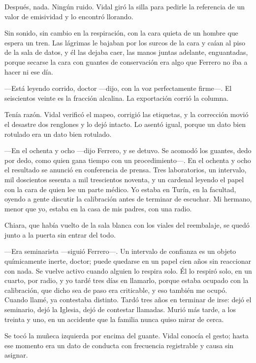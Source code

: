 Después, nada. Ningún ruido. Vidal giró la silla para pedirle la referencia de un valor de emisividad y lo encontró llorando.

Sin sonido, sin cambio en la respiración, con la cara quieta de un hombre que espera un tren. Las lágrimas le bajaban por los surcos de la cara y caían al piso de la sala de datos, y él las dejaba caer, las manos juntas adelante, enguantadas, porque secarse la cara con guantes de conservación era algo que Ferrero no iba a hacer ni ese día.

---Está leyendo corrido, doctor ---dijo, con la voz perfectamente firme---. El seiscientos veinte es la fracción alcalina. La exportación corrió la columna.

Tenía razón. Vidal verificó el mapeo, corrigió las etiquetas, y la corrección movió el desastre dos renglones y lo dejó intacto. Lo asentó igual, porque un dato bien rotulado era un dato bien rotulado.

---En el ochenta y ocho ---dijo Ferrero, y se detuvo. Se acomodó los guantes, dedo por dedo, como quien gana tiempo con un procedimiento---. En el ochenta y ocho el resultado se anunció en conferencia de prensa. Tres laboratorios, un intervalo, mil doscientos sesenta a mil trescientos noventa, y un cardenal leyendo el papel con la cara de quien lee un parte médico. Yo estaba en Turín, en la facultad, oyendo a gente discutir la calibración antes de terminar de escuchar. Mi hermano, menor que yo, estaba en la casa de mis padres, con una radio.

Chiara, que había vuelto de la sala blanca con los viales del reembalaje, se quedó junto a la puerta sin entrar del todo.

---Era seminarista ---siguió Ferrero---. Un intervalo de confianza es un objeto químicamente inerte, doctor; puede quedarse en un papel cien años sin reaccionar con nada. Se vuelve activo cuando alguien lo respira solo. Él lo respiró solo, en un cuarto, por radio, y yo tardé tres días en llamarlo, porque estaba ocupado con la calibración, que dicho sea de paso era criticable, y eso también me ocupó. Cuando llamé, ya contestaba distinto. Tardó tres años en terminar de irse: dejó el seminario, dejó la Iglesia, dejó de contestar llamadas. Murió más tarde, a los treinta y uno, en un accidente que la familia nunca quiso mirar de cerca.

Se tocó la muñeca izquierda por encima del guante. Vidal conocía el gesto; hasta ese momento era un dato de conducta con frecuencia registrable y causa sin asignar.

